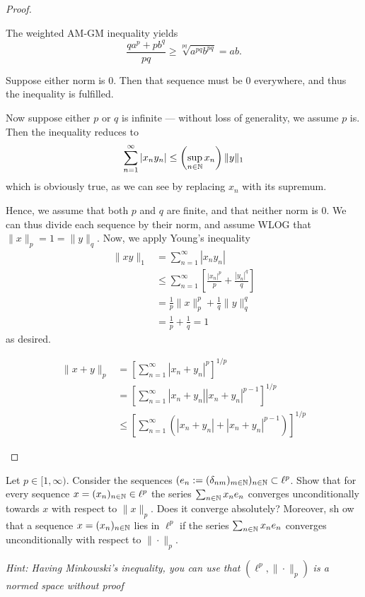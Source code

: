 \begin{proof}
	\begin{parts}
		\item The weighted AM-GM inequality yields
		\[
		\frac{q a^p + p b^q}{pq}\ge \sqrt[pq]{a^{pq} b^{pq}} =ab
		.\]
		\item Suppose either norm is 0. Then that sequence must be 0 everywhere, and thus the inequality is fulfilled. 
		
		Now suppose either $p$ or $q$ is infinite --- without loss of generality, we assume $p$ is. Then the inequality reduces to
		\[\sum_{n=1}^\infty |x_n y_n| \le \left(\sup_{n\in \mathbb{N}} x_n\right) \|y\|_1\]
		which is obviously true, as we can see by replacing $x_n$ with its supremum. 
		
		Hence, we assume that both $p$ and $q$ are finite, and that neither norm is $0$. We can thus divide each sequence by their norm, and assume WLOG that $\|x\|_p=1=\|y\|_q$.  Now, we apply Young's inequality
		\begin{align*}
			\|xy\|_1 &= \sum_{n=1}^\infty |x_n y_n|\\
			&\le\sum_{n=1}^{\infty} \left[ \frac{|x_n|^p}{p}+\frac{|y_n|^q}{q} \right] \\
			&=\frac{1}{p}\|x\|_p^p+\frac{1}{q}\|y \|_q^q\\
			&=\frac{1}{p}+\frac{1}{q}=1
		\end{align*}
	as desired. 
	\item 
	\begin{align*}
		\|x+y\|_p &= \left[\sum_{n=1}^\infty |x_n+y_n|^p\right]^{1/p}\\
		&=\left[\sum_{n=1}^\infty |x_n+y_n||x_n+y_n|^{p-1}\right]^{1/p}\\
		&\le\left[\sum_{n=1}^\infty \left(|x_n+y_n|+|x_n+y_n|^{p-1}\right)\right]^{1/p}
	\end{align*}
	\end{parts}
\end{proof}
\begin{Problem}
	Let $p\in [1,\infty)$. Consider the sequences $(e_n:=(\delta_{nm})_{m\in \mathbb{N}})_{n\in \mathbb{N}}\subset \ell^p$. Show that for every sequence $x=(x_n)_{n\in \mathbb{N}}\in \ell^p$ the series $\sum_{n\in \mathbb{N}} x_n e_n$ converges unconditionally towards $x$ with respect to $\|x\|_p$. Does it converge absolutely? Moreover, sh ow that a sequence $x=(x_n)_{n\in \mathbb{N}}$ lies in $\ell^p$ if the series $\sum_{n\in \mathbb{N}}x_n e_n$ converges unconditionally with respect to $\|\cdot\|_p$.

	\emph{Hint: Having Minkowski's inequality, you can use that } $(\ell^p, \|\cdot\|_p)$ \emph{is a normed space without proof}
\end{Problem}

